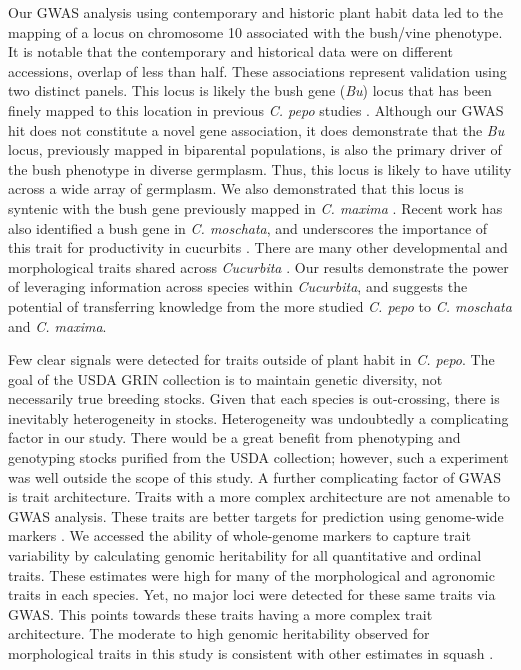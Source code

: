 \documentclass[utf8]{FrontiersinHarvard} %
\begin{document}
Our GWAS analysis using contemporary and historic plant habit data led to the mapping of a locus on chromosome 10 associated with the bush/vine phenotype. It is notable that the contemporary and historical data were on different accessions, overlap of less than half.  These associations represent validation using two distinct panels. This locus is likely the bush gene (\textit{Bu}) locus that has been finely mapped to this location in previous \textit{C. pepo} studies \citep{Xiang2018, Ding2021}. Although our GWAS hit does not constitute a novel gene association, it does demonstrate that the \textit{Bu} locus, previously mapped in biparental populations, is also the primary driver of the bush phenotype in diverse germplasm. Thus, this locus is likely to have utility across a wide array of germplasm. We also demonstrated that this locus is syntenic with the bush gene previously mapped in \textit{C. maxima} \citep{Zhang2015}. Recent work has also identified a bush gene in \textit{C. moschata}, and underscores the importance of this trait for productivity in cucurbits \citep{Wang2022}. There are many other developmental and morphological traits shared across \textit{Cucurbita} \citep{Paris2005}. Our results demonstrate the power of leveraging information across species within \textit{Cucurbita}, and suggests the potential of transferring knowledge from the more studied \textit{C. pepo} to \textit{C. moschata} and \textit{C. maxima}.


Few clear signals were detected for traits outside of plant habit in \textit{C. pepo}. The goal of the USDA GRIN collection is to maintain genetic diversity, not necessarily true breeding stocks. Given that each species is out-crossing, there is inevitably heterogeneity in stocks. Heterogeneity was undoubtedly a complicating factor in our study. There would be a great benefit from phenotyping and genotyping stocks purified from the USDA collection; however, such a experiment was well outside the scope of this study. A further complicating factor of GWAS is trait architecture. Traits with a more complex architecture are not amenable to GWAS analysis. These traits are better targets for prediction using genome-wide markers \citep{Meuwissen2001}. We accessed the ability of whole-genome markers to capture trait variability by calculating genomic heritability for all quantitative and ordinal traits. These estimates were high for many of the morphological and agronomic traits in each species. Yet, no major loci were detected for these same traits via GWAS. This points towards these traits having a more complex trait architecture. The moderate to high genomic heritability observed for morphological traits in this study is consistent with other estimates in squash \citep{Hernandez2020}.
\end{document}
